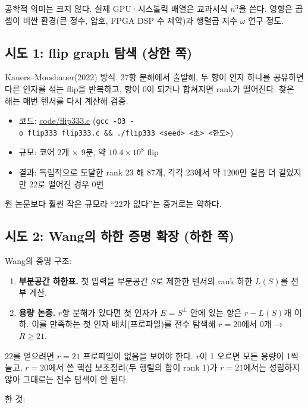 공학적 의미는 크지 않다. 실제 GPU·시스톨릭 배열은 교과서식 \(n^3\)을
쓴다. 영향은 곱셈이 비싼 환경(큰 정수, 암호, FPGA DSP 수 제약)과 행렬곱
지수 \(\omega\) 연구 정도.

\subsection{시도 1: flip graph 탐색 (상한 쪽)}

Kauers--Moosbauer(2022) 방식. 27항 분해에서 출발해, 두 항이 인자 하나를
공유하면 다른 인자를 섞는 flip을 반복하고, 항이 0이 되거나 합쳐지면
rank가 떨어진다. 찾은 해는 매번 텐서를 다시 계산해 검증.

\begin{itemize}
\tightlist
\item
  코드: \url{code/flip333.c}
  (\texttt{gcc\ -O3\ -o\ flip333\ flip333.c\ \&\&\ ./flip333\ \textless{}seed\textgreater{}\ \textless{}초\textgreater{}\ \textless{}한도\textgreater{}})
\item
  규모: 코어 2개 × 9분, 약 \(10.4\times10^8\) flip
\item
  결과: 독립적으로 도달한 rank 23 해 87개, 각각 23에서 약 1200만 걸음 더
  걸었지만 22로 떨어진 경우 0번
\end{itemize}

원 논문보다 훨씬 작은 규모라 ``22가 없다''는 증거로는 약하다.

\subsection{시도 2: Wang의 하한 증명 확장 (하한 쪽)}

Wang의 증명 구조:

\begin{enumerate}
\def\labelenumi{\arabic{enumi}.}
\tightlist
\item
  \textbf{부분공간 하한표.} 첫 입력을 부분공간 \(S\)로 제한한 텐서의
  rank 하한 \(L(S)\)를 전부 계산.
\item
  \textbf{용량 논증.} \(r\)항 분해가 있다면 첫 인자가 \(E=S^\perp\) 안에
  있는 항은 \(r-L(S)\)개 이하. 이를 만족하는 첫 인자 배치(프로파일)를
  전수 탐색해 \(r=20\)에서 0개 → \(R\ge21\).
\end{enumerate}

22를 얻으려면 \(r=21\) 프로파일이 없음을 보여야 한다. \(r\)이 1 오르면
모든 용량이 1씩 늘고, \(r=20\)에서 쓴 핵심 보조정리(두 행렬의 합이 rank
1)가 \(r=21\)에서는 성립하지 않아 그대로는 전수 탐색이 안 된다.

한 것:

